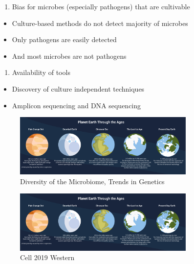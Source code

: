 \documentclass[
]{book}
\providecommand{\tightlist}{%
  \setlength{\itemsep}{0pt}\setlength{\parskip}{0pt}}
\begin{document}
\begin{enumerate}
\def\labelenumi{\arabic{enumi}.}
\tightlist
\item
  Bias for microbes (especially pathogens) that are
  cultivable
\end{enumerate}

\begin{itemize}
\tightlist
\item
  Culture-based methods do not detect majority of microbes
\item
  Only pathogens are easily detected
\item
  And most microbes are not pathogens
\end{itemize}

\begin{enumerate}
\def\labelenumi{\arabic{enumi}.}
\setcounter{enumi}{1}
\tightlist
\item
  Availability of tools
\end{enumerate}

\begin{itemize}
\tightlist
\item
  Discovery of culture independent techniques
\item
  Amplicon sequencing and DNA sequencing
\end{itemize}

\begin{figure}
\centering
\includegraphics[width=0.8\textwidth,height=\textheight]{./Figures/Planets.png}
\caption{Diversity of the Microbiome, Trends in Genetics}
\end{figure}

\begin{figure}
\centering
\includegraphics[width=0.8\textwidth,height=\textheight]{./Figures/Planets.png}
\caption{Cell 2019 Western}
\end{figure}
\end{document}
